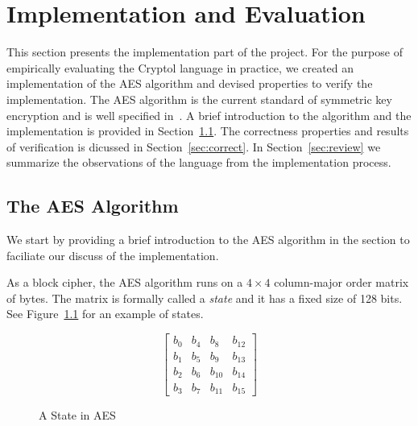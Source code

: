 \documentclass[a4paper, notitlepage]{report}
\begin{document}
\newpage

\chapter{Implementation and Evaluation}

This section presents the implementation part of the project. For the purpose of
empirically evaluating the Cryptol language in practice, we created an implementation
of the AES algorithm and devised properties to verify the implementation.
The AES algorithm is the current standard of symmetric key
encryption and is well specified in~\cite{standard2001announcing}. A brief introduction
to the algorithm and the implementation is provided in Section~\ref{sec:aes}.
The correctness properties and results of verification is dicussed in
Section~\ref{sec:correct}. In Section~\ref{sec:review} we summarize the observations
of the language from the implementation process. 

\section{The AES Algorithm}
\label{sec:aes}

We start by providing a brief introduction to the AES algorithm in the section
to faciliate our discuss of the implementation.

As a block cipher, the AES
algorithm runs on a $4 \times 4$ column-major order matrix of bytes.
The matrix is formally called a \emph{state} and it has a fixed size of 128 bits.
See Figure~\ref{fig:state} for an example of states.

\begin{figure}
  \begin{center}
    \begin{equation}
      \begin{bmatrix}
        b_0 & b_4 & b_8 & b_{12} \\
        b_1 & b_5 & b_9 & b_{13} \\
        b_2 & b_6 & b_{10} & b_{14} \\
        b_3 & b_7 & b_{11} & b_{15} 
      \end{bmatrix}
    \end{equation}
  \end{center}
  \caption{A State in AES}
  \label{fig:state}
\end{figure}
\end{document}
